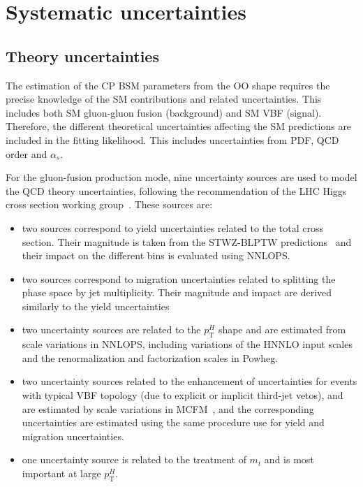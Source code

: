 \section{Systematic uncertainties}
\label{sec:syst}

\subsection{Theory uncertainties}
\label{ssec:theoryuncert}
The estimation of the CP BSM parameters from the OO shape requires the precise knowledge of the SM contributions and related uncertainties. This includes both SM gluon-gluon fusion (background) and SM VBF (signal).
 Therefore, the different theoretical uncertainties affecting the SM predictions are included in the fitting likelihood. This includes uncertainties from PDF, QCD order and $\alpha_s$.

For the gluon-fusion production mode, nine uncertainty sources are used to model the QCD theory
uncertainties, following the recommendation of the LHC Higgs cross section working group~\cite{LHCXS_4}. These sources are:
\begin{itemize}
\item two sources correspond to yield uncertainties related to the total cross section. Their magnitude is taken from the
STWZ-BLPTW predictions~\cite{ggF_qcd_unc_1,ggF_qcd_unc_2,LHCXS_4} and their impact on the different bins is evaluated using
NNLOPS.
\item two sources correspond to migration uncertainties related to splitting the phase space by jet multiplicity. Their magnitude and impact are derived similarly to the yield uncertainties
\item two uncertainty sources are related to the $p_\mathrm{T}^H$ shape and are estimated from scale
variations in NNLOPS, including variations of the HNNLO input scales and the renormalization
and factorization scales in Powheg.
\item two uncertainty sources related to the enhancement of uncertainties for events with typical VBF topology (due to explicit or implicit third-jet vetos), and are estimated by scale variations in MCFM~\cite{MCFM}, and the corresponding uncertainties are estimated using the same procedure use for yield and migration uncertainties.
\item one uncertainty source is related to the treatment of $m_t$ and is most important at large $p_\mathrm{T}^H$.
\end{itemize}

